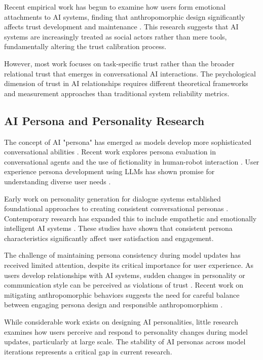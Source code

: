 \documentclass{article}
\begin{document}
Recent empirical work has begun to examine how users form emotional attachments to AI systems, finding that anthropomorphic design significantly affects trust development and maintenance \citep{ta2020users, lee2020ai}. This research suggests that AI systems are increasingly treated as social actors rather than mere tools, fundamentally altering the trust calibration process.

However, most work focuses on task-specific trust rather than the broader relational trust that emerges in conversational AI interactions. The psychological dimension of trust in AI relationships requires different theoretical frameworks and measurement approaches than traditional system reliability metrics.

\subsection{AI Persona and Personality Research}

The concept of AI "persona" has emerged as models develop more sophisticated conversational abilities \citep{rashkin2018empathetic, zhong2020pec}. Recent work explores persona evaluation in conversational agents \citep{kaate2025evaluating} and the use of fictionality in human-robot interaction \citep{kaate2025fourth}. User experience persona development using LLMs has shown promise for understanding diverse user needs \citep{hur2024utilizing}.

Early work on personality generation for dialogue systems established foundational approaches to creating consistent conversational personas \citep{mairesse2007personage, walker2007generally}. Contemporary research has expanded this to include empathetic and emotionally intelligent AI systems \citep{shum2018eliza, zhou2020design}. These studies have shown that consistent persona characteristics significantly affect user satisfaction and engagement.

The challenge of maintaining persona consistency during model updates has received limited attention, despite its critical importance for user experience. As users develop relationships with AI systems, sudden changes in personality or communication style can be perceived as violations of trust \citep{wu2025memory}. Recent work on mitigating anthropomorphic behaviors suggests the need for careful balance between engaging persona design and responsible anthropomorphism \citep{cheng2025mitigating}.

While considerable work exists on designing AI personalities, little research examines how users perceive and respond to personality changes during model updates, particularly at large scale. The stability of AI personas across model iterations represents a critical gap in current research.
\end{document}
